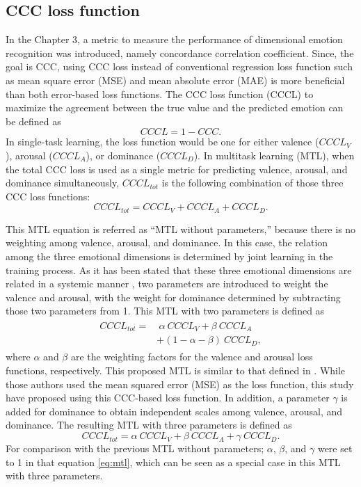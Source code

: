 \subsection{CCC loss function}

In the Chapter 3, a metric to measure the performance of dimensional emotion
recognition was introduced, namely concordance correlation coefficient. Since,
the goal is CCC, using CCC loss instead of conventional regression loss
function such as mean square error (MSE) and mean absolute error (MAE) is more
beneficial than both error-based loss functions.  The CCC loss function (CCCL)
to maximize the agreement between the true value and the predicted emotion can
be defined as 
\begin{equation}
 CCCL = 1 - CCC.
\end{equation}
In single-task learning, the loss function would be one for either valence
($CCCL_{V}$), arousal ($CCCL_{A}$), or dominance ($CCCL_{D}$). In multitask
learning (MTL), when the total CCC loss is used as a single metric for
predicting valence, arousal, and dominance simultaneously, $CCCL_{tot}$ is the
following combination of those three CCC loss functions:
\begin{equation}
 CCCL_{tot} = CCCL_{V} + CCCL_{A} + CCCL_{D}.
\label{eq:mtl}
\end{equation}

\noindent This MTL equation is referred as ``MTL without parameters,'' because
there is no weighting among valence, arousal, and dominance. In this case, the
relation among the three emotional dimensions is determined by joint learning
in the training process. As it has been stated that these three emotional
dimensions are related in a systemic manner \cite{Gunes2010}, two parameters
are introduced to weight the valence and arousal, with the weight for dominance
determined by subtracting those two parameters from 1. This MTL with two
parameters is defined as
\begin{align}
\begin{split}
 CCCL_{tot} =& ~ \alpha ~ CCCL_{V} + \beta ~ CCCL_{A} \\
 &+ (1-\alpha-\beta) ~ CCCL_{D},
\label{eq:mtl-2}
\end{split}
\end{align}
where $\alpha$ and $\beta$ are the weighting factors for the valence and
arousal loss functions, respectively. This proposed MTL is similar to that
defined in \cite{parthasarathy2017jointly}. While those authors used the mean
squared error (MSE) as the loss function, this study have proposed using this
CCC-based loss function. In addition, a parameter $\gamma$ is added for
dominance to obtain independent scales among valence, arousal, and dominance.
The resulting MTL with three parameters is defined as 
\begin{equation}
 CCCL_{tot} = \alpha ~ CCCL_{V} + \beta ~ CCCL_{A} + \gamma ~ CCCL_{D}.
\label{eq:mtl-3}
\end{equation}
For comparison with the previous MTL without parameters; $\alpha$, $\beta$, and
$\gamma$ were set to 1 in that equation \ref{eq:mtl}, which can be seen as a
special case in this MTL with three parameters.

